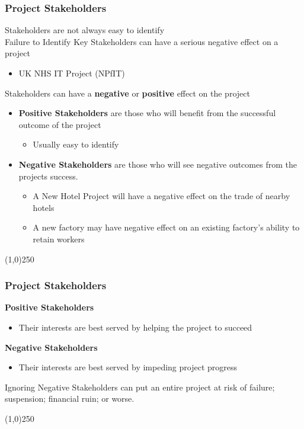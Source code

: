\begin{frame}
\frametitle{Project Stakeholders}
Stakeholders are not always easy to identify\\
Failure to Identify Key Stakeholders can have a serious negative effect on a project\\
\begin{itemize}
	\item UK NHS IT Project (NPfIT)
\end{itemize}
Stakeholders can have a \textbf{negative} or \textbf{positive} effect on the project\\
\begin{itemize}
	\item \textbf{Positive Stakeholders} are those who will benefit from the successful outcome of the project
	\begin{itemize}
		\item Usually easy to identify
	\end{itemize}
	\item \textbf{Negative Stakeholders} are those who will see negative outcomes from the projects success.
	\begin{itemize}
		\item A New Hotel Project will have a negative effect on the trade of nearby hotels
		\item A new factory may have negative effect on an existing factory's ability to retain workers
	\end{itemize}
\end{itemize}
\end{frame}
\begin{center}\line(1,0){250}\end{center}



\begin{frame}
\frametitle{Project Stakeholders}
\textbf{Positive Stakeholders}\\
\begin{itemize}
	\item Their interests are best served by helping the project to succeed
\end{itemize}
\textbf{Negative Stakeholders}\\
\begin{itemize}
	\item Their interests are best served by impeding project progress
\end{itemize}
Ignoring Negative Stakeholders can put an entire project at risk of failure; suspension; financial ruin; or worse.\\
\end{frame}
\begin{center}\line(1,0){250}\end{center}



